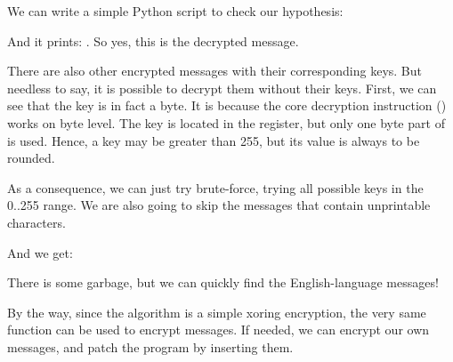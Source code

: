 We can write a simple Python script to check our hypothesis:



And it prints: .
So yes, this is the decrypted message.

There are also 
other encrypted messages with their corresponding keys.
But needless to say, it is possible 
to decrypt them without their keys.
First, we can see that the key 
is in fact a byte.
It is because the core decryption instruction
(\XOR) works on byte level. 
The key is located in the \ESI register, but only one byte part of \ESI is used.
Hence, a key may be greater than 255, 
but its value is always to be rounded.


As a consequence, we can just try brute-force, trying all possible keys in the 0..255 range.
We are also going to skip 
the messages that contain unprintable characters.



And we get:



There 
is some garbage, but we can quickly find the English-language messages!

By the way, since the algorithm is a simple xoring encryption, the very same function can be used
to encrypt messages.
If needed, we can encrypt our own messages, and patch the program by inserting them.

